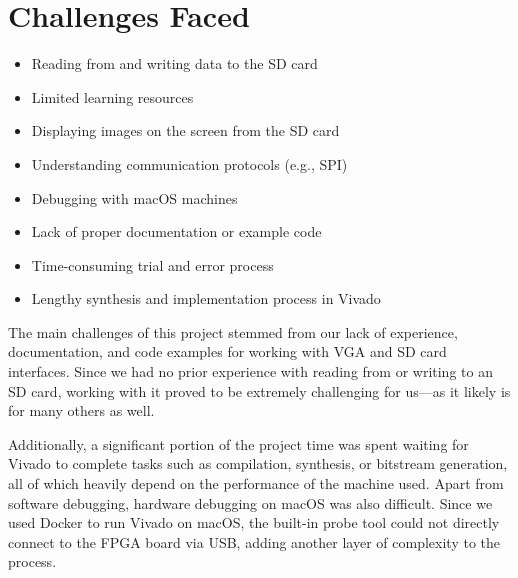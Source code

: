 \section{Challenges Faced}

\begin{itemize}
    \item Reading from and writing data to the SD card
    \item Limited learning resources
    \item Displaying images on the screen from the SD card
    \item Understanding communication protocols (e.g., SPI)
    \item Debugging with macOS machines
    \item Lack of proper documentation or example code
    \item Time-consuming trial and error process
    \item Lengthy synthesis and implementation process in Vivado
\end{itemize}

The main challenges of this project stemmed from our lack of experience, documentation, and code examples for working with VGA and SD card interfaces.  
Since we had no prior experience with reading from or writing to an SD card, working with it proved to be extremely challenging for us—as it likely is for many others as well.

Additionally, a significant portion of the project time was spent waiting for Vivado to complete tasks such as compilation, synthesis, or bitstream generation, all of which heavily depend on the performance of the machine used.  
Apart from software debugging, hardware debugging on macOS was also difficult. Since we used Docker to run Vivado on macOS, the built-in probe tool could not directly connect to the FPGA board via USB, adding another layer of complexity to the process.
